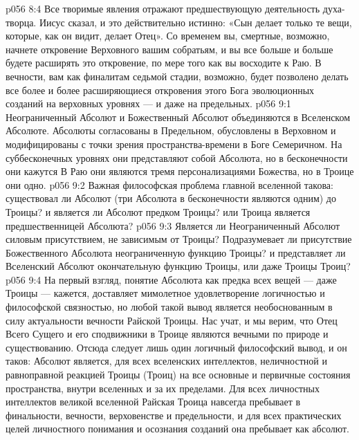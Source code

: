 \vs p056 8:4 Все творимые явления отражают предшествующую деятельность духа\hyp{}творца. Иисус сказал, и это действительно истинно: «Сын делает только те вещи, которые, как он видит, делает Отец». Со временем вы, смертные, возможно, начнете откровение Верховного вашим собратьям, и вы все больше и больше будете расширять это откровение, по мере того как вы восходите к Раю. В вечности, вам как финалитам седьмой стадии, возможно, будет позволено делать все более и более расширяющиеся откровения этого Бога эволюционных созданий на верховных уровнях --- и даже на предельных.
\vs p056 9:1 Неограниченный Абсолют и Божественный Абсолют объединяются в Вселенском Абсолюте. Абсолюты согласованы в Предельном, обусловлены в Верховном и модифицированы с точки зрения пространства\hyp{}времени в Боге Семеричном. На суббесконечных уровнях они представляют собой  Абсолюта, но в бесконечности они кажутся  В Раю они являются тремя персонализациями Божества, но в Троице они  одно.
\vs p056 9:2 \pc Важная философская проблема главной вселенной такова: существовал ли Абсолют (три Абсолюта в бесконечности являются одним) до Троицы? и является ли Абсолют предком Троицы? или Троица является предшественницей Абсолюта?
\vs p056 9:3 Является ли Неограниченный Абсолют силовым присутствием, не зависимым от Троицы? Подразумевает ли присутствие Божественного Абсолюта неограниченную функцию Троицы? и представляет ли Вселенский Абсолют окончательную функцию Троицы, или даже Троицы Троиц?
\vs p056 9:4 На первый взгляд, понятие Абсолюта как предка всех вещей --- даже Троицы --- кажется, доставляет мимолетное удовлетворение логичностью и философской связностью, но любой такой вывод является необоснованным в силу актуальности вечности Райской Троицы. Нас учат, и мы верим, что Отец Всего Сущего и его сподвижники в Троице являются вечными по природе и существованию. Отсюда следует лишь один логичный философский вывод, и он таков: Абсолют является, для всех вселенских интеллектов, неличностной и равноправной реакцией Троицы (Троиц) на все основные и первичные состояния пространства, внутри вселенных и за их пределами. Для всех личностных интеллектов великой вселенной Райская Троица навсегда пребывает в финальности, вечности, верховенстве и предельности, и для всех практических целей личностного понимания и осознания созданий она пребывает как абсолют.
